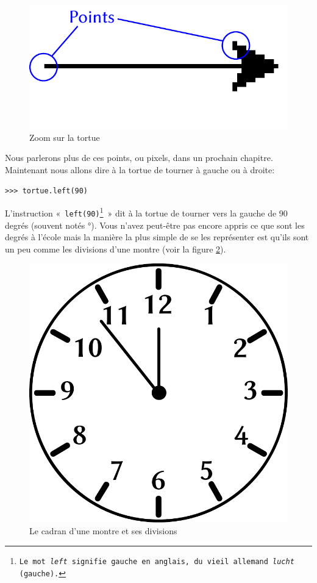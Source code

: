 \begin{figure}[!ht]
\centering
\includegraphics[scale=1]{images/points.pdf}
\caption{Zoom sur la tortue}
\label{fig:points}
\end{figure}

Nous parlerons plus de ces points, ou pixels, dans un prochain chapitre.
Maintenant nous allons dire à la tortue de tourner à gauche ou à droite:

\begin{Verbatim}[frame=single,rulecolor=\color{mbleu}, label=à taper]
>>> tortue.left(90)
\end{Verbatim}

L'instruction «~\texttt{left(90)\footnote{Le mot \emph{left} signifie gauche en anglais, du vieil allemand \emph{lucht} (gauche).}}~»  dit à la tortue de tourner vers la gauche de 90 degrés (souvent notés °). Vous n'avez peut-être pas encore appris ce que sont les degrés à l'école mais la manière la plus simple de se les représenter est qu'ils sont un peu comme les divisions d'une montre (voir la figure \ref{fig:clock}).
\begin{figure}[H]
\centering
\includegraphics[scale=0.5]{images/clock.pdf}
\caption{Le cadran d'une montre et ses divisions}
\label{fig:clock}
\end{figure}

